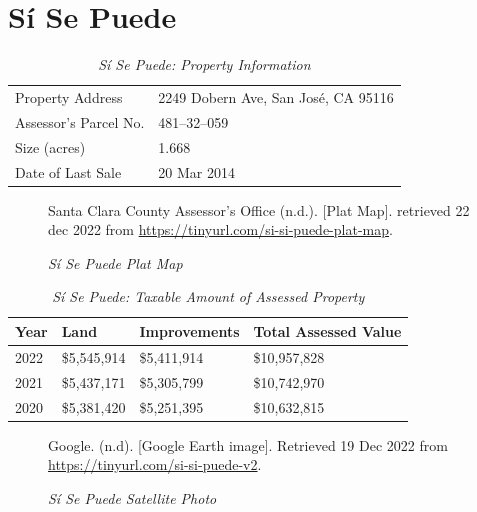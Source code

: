 
\clearpage
\section{Sí Se Puede}\label{sec:sí-se-puede-info}\indent

\begin{table}[htbp]
  \SingleSpacing%
  \caption[Sí Se Puede: Property Information]{\textit{Sí Se Puede: Property Information}}\label{tab:sí-se-puede-prop-info}
  \begin{tabular}{ll}
    \toprule
    Property Address      & 2249 Dobern Ave, San José, CA 95116 \\
    Assessor's Parcel No. &  481–32–059 \\
    Size (acres)          &  1.668\\
    Date of Last Sale     &  20 Mar 2014 \\
    \bottomrule
  \end{tabular}
\end{table}

\begin{figure}[hbtp]
  \caption[Sí Se Puede Plat Map]{\textit{Sí Se Puede Plat Map}}%
  \label{fig:sí-se-puede-plat-map}
  {Santa Clara County Assessor's Office (n.d.). [Plat Map]. retrieved 22 dec 2022 from \url{https://tinyurl.com/si-si-puede-plat-map}.}
\end{figure}

\begin{table}[htbp]
  \SingleSpacing%
  \caption[Sí Se Puede: Taxable Amount of Assessed Property]{\textit{Sí Se Puede: Taxable Amount of Assessed Property}}%
  \label{tab:sí-se-puede-taxable-amount}
  \begin{tabular}{llll}
    \toprule
    Year & Land        & Improvements & Total Assessed Value \\
    \midrule
    2022 & \$5,545,914 & \$5,411,914  & \$10,957,828 \\
    2021 & \$5,437,171 & \$5,305,799  & \$10,742,970 \\
    2020 & \$5,381,420 & \$5,251,395  & \$10,632,815 \\
    \bottomrule
  \end{tabular}
\end{table}

\begin{figure}[hbtp]
  \caption[Sí Se Puede Satellite Photo]{\textit{Sí Se Puede Satellite Photo}}%
  \label{fig:sí-se-puede-sat-photo}
  {Google. (n.d). [Google Earth image]. Retrieved 19 Dec 2022 from \url{https://tinyurl.com/si-si-puede-v2}.}
\end{figure}

